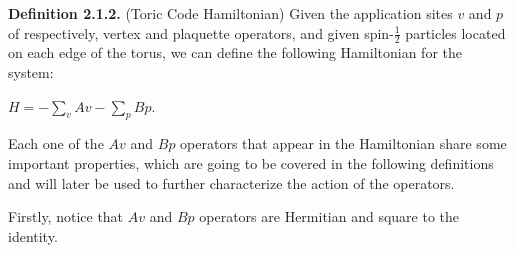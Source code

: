 \documentclass[12pt]{report}
\begin{document}
\begin{minipage}{1\textwidth}
		\textbf{Definition 2.1.2.} (Toric Code Hamiltonian) Given the application sites $v$ and $p$ of  respectively, vertex and plaquette operators, and given spin-$\frac{1}{2}$ particles located on each edge of the torus, we can define the following Hamiltonian for the system:\newline
		
		\begin{center}
			
			$H = -\sum_{v} 
			Av - \sum_{p} Bp $.\newline
			
		\end{center}
		
		Each one of the $Av$ and $Bp$ operators that appear in the Hamiltonian share some important properties, which are going to be covered in the following definitions and will later be used to further characterize the action of the operators. \newline
		
		
		Firstly, notice that $Av$ and $Bp$ operators are Hermitian and square to the identity. \newline
		
	\end{minipage}  
	
\end{document}
